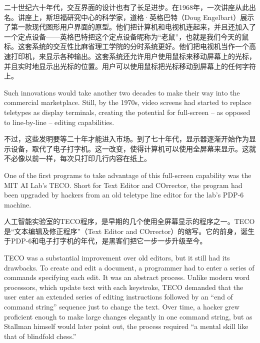 \ifdefined\chs
二十世纪六十年代，交互界面的设计也有了长足进步。在1968年，一次讲座从此出名。讲座上，斯坦福研究中心的科学家，道格·英格巴特（Doug Engelbart）展示了第一款现代图形用户界面的原型。他们把计算机和电视机连起来，并且还加入了一个定点设备——英格巴特把这个定点设备昵称为``老鼠''，也就是我们今天的鼠标。这套系统的交互性比麻省理工学院的分时系统更好。他们把电视机当作一个高速打印机，来显示各种输出。这套系统还允许用户使用鼠标来移动屏幕上的光标，并且实时地显示出光标的位置。用户可以使用鼠标把光标移动到屏幕上的任何字符上。
\fi

\ifdefined\eng
Such innovations would take another two decades to make their way into the commercial marketplace. Still, by the 1970s, video screens had started to replace teletypes as display terminals, creating the potential for full-screen -- as opposed to line-by-line -- editing capabilities.
\fi

\ifdefined\chs
不过，这些发明要等二十年才能进入市场。到了七十年代，显示器逐渐开始作为显示设备，取代了电子打字机。这一改变，使得计算机可以使用全屏幕来显示。这就不必像以前一样，每次只打印几行内容在纸上。
\fi

\ifdefined\eng
One of the first programs to take advantage of this full-screen capability was the MIT AI Lab's TECO. Short for Text Editor and COrrector, the program had been upgraded by hackers from an old teletype line editor for the lab's PDP-6 machine.
\fi

\ifdefined\chs
人工智能实验室的TECO程序，是早期的几个使用全屏幕显示的程序之一。TECO是``文本编辑及修正程序''（Text Editor and COrrector）的缩写。它的前身，诞生于PDP-6和电子打字机的年代，是黑客们把它一步一步升级至今。
\fi

\ifdefined\eng
TECO was a substantial improvement over old editors, but it still had its drawbacks. To create and edit a document, a programmer had to enter a series of commands specifying each edit. It was an abstract process. Unlike modern word processors, which update text with each keystroke, TECO demanded that the user enter an extended series of editing instructions followed by an ``end of command string'' sequence just to change the text. Over time, a hacker grew proficient enough to make large changes elegantly in one command string, but as Stallman himself would later point out, the process required ``a mental skill like that of blindfold chess.''
\fi

